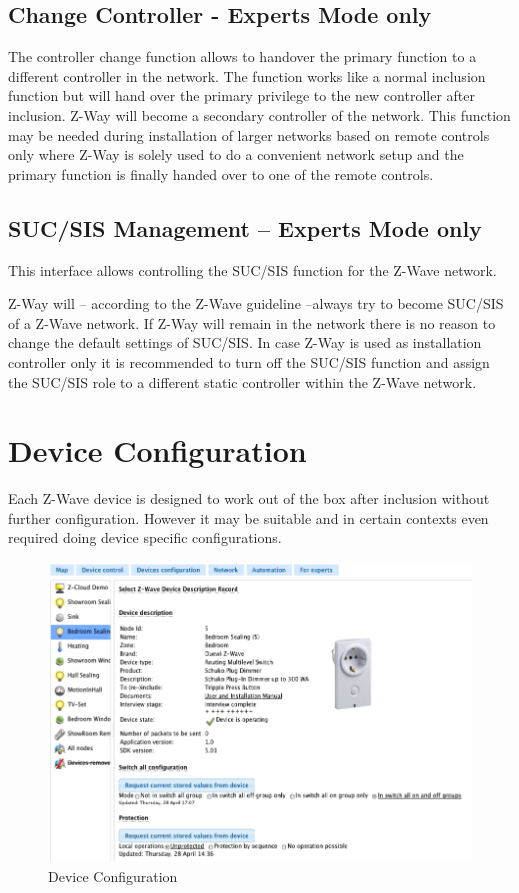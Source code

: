 \subsection{Change Controller - Experts Mode only}

The controller change function allows to handover the primary function to a different controller 
in the network. The function works like a normal inclusion function but will hand over the primary 
privilege to the new controller after inclusion. Z-Way will become a secondary controller of the 
network.
This function may be needed during installation of larger networks based on remote controls only 
where Z-Way is solely used to do a convenient network setup and the primary function is finally 
handed over to one of the remote controls.

\subsection{SUC/SIS Management – Experts Mode only}

This interface allows controlling the SUC/SIS function for the Z-Wave network.

Z-Way will – according to the Z-Wave guideline –always try to become SUC/SIS of a Z-Wave network. 
If Z-Way will remain in the network there is no reason to change the default settings of SUC/SIS.  
In case Z-Way is used as installation controller only it is recommended to turn off the SUC/SIS 
function and assign the SUC/SIS role to a different static controller within the Z-Wave network.


\section{Device Configuration}  

Each Z-Wave device is designed to work out of the box after inclusion without further configuration. 
However it may be suitable and in certain contexts even required doing device specific configurations.

\begin{figure} 
\begin{center}
\includegraphics[scale=0.8]{pics/dconfig.png}
\caption{Device Configuration}
\end{center} 
\end{figure} 

